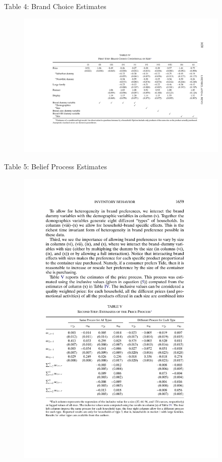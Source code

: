 \documentclass[xcolor=pdftex,dvipsnames,table,mathserif,aspectratio=169]{beamer}
\begin{document}
\begin{frame}{Table 4: Brand Choice Estimates}
\begin{figure}[htbp]
\begin{center}
\includegraphics[width=4in]{resources/hntable4.pdf}
\label{gandr1}
\end{center}
\end{figure}
\end{frame}

\begin{frame}{Table 5: Belief Process Estimates}
\begin{figure}[htbp]
\begin{center}
\includegraphics[width=4in]{resources/hntable5.pdf}
\label{gandr1}
\end{center}
\end{figure}
\end{frame}
\end{document}
